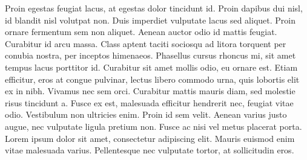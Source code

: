 \documentclass[twoside,a4paper]{article}
\begin{document}
\begin{triple}
Proin egestas feugiat lacus, at egestas dolor tincidunt id. Proin dapibus dui nisl, id blandit nisl volutpat non. Duis imperdiet vulputate lacus sed aliquet. Proin ornare fermentum sem non aliquet. Aenean auctor odio id mattis feugiat. Curabitur id arcu massa. Class aptent taciti sociosqu ad litora torquent per conubia nostra, per inceptos himenaeos. Phasellus cursus rhoncus mi, sit amet tempus lacus porttitor id. Curabitur sit amet mollis odio, eu ornare est. Etiam efficitur, eros at congue pulvinar, lectus libero commodo urna, quis lobortis elit ex in nibh. Vivamus nec sem orci.
Curabitur mattis mauris diam, sed molestie risus tincidunt a. Fusce ex est, malesuada efficitur hendrerit nec, feugiat vitae odio. Vestibulum non ultricies enim. Proin id sem velit. Aenean varius justo augue, nec vulputate ligula pretium non. Fusce ac nisi vel metus placerat porta. Lorem ipsum dolor sit amet, consectetur adipiscing elit. Mauris euismod enim vitae malesuada varius. Pellentesque nec vulputate tortor, at sollicitudin eros.
\end{triple}
\end{document}
